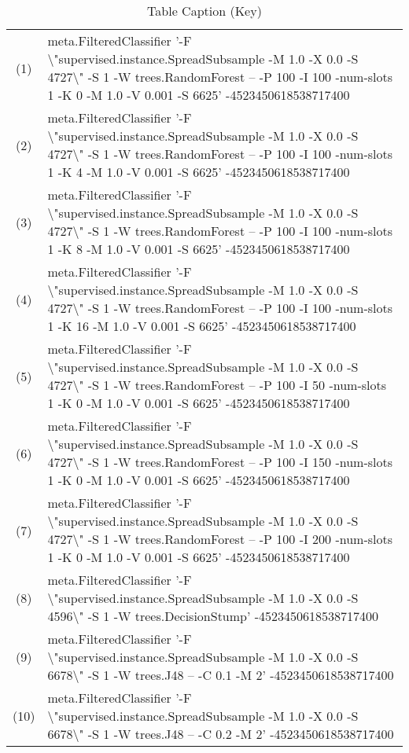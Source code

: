 \begin{table}[thb]
\caption{\label{labelname}Table Caption (Key)}
\scriptsize
{\centering
\begin{tabular}{cl}\\
(1) & meta.FilteredClassifier '-F \textbackslash"supervised.instance.SpreadSubsample -M 1.0 -X 0.0 -S 4727\textbackslash" -S 1 -W trees.RandomForest -- -P 100 -I 100 -num-slots 1 -K 0 -M 1.0 -V 0.001 -S 6625' -4523450618538717400 \\
(2) & meta.FilteredClassifier '-F \textbackslash"supervised.instance.SpreadSubsample -M 1.0 -X 0.0 -S 4727\textbackslash" -S 1 -W trees.RandomForest -- -P 100 -I 100 -num-slots 1 -K 4 -M 1.0 -V 0.001 -S 6625' -4523450618538717400 \\
(3) & meta.FilteredClassifier '-F \textbackslash"supervised.instance.SpreadSubsample -M 1.0 -X 0.0 -S 4727\textbackslash" -S 1 -W trees.RandomForest -- -P 100 -I 100 -num-slots 1 -K 8 -M 1.0 -V 0.001 -S 6625' -4523450618538717400 \\
(4) & meta.FilteredClassifier '-F \textbackslash"supervised.instance.SpreadSubsample -M 1.0 -X 0.0 -S 4727\textbackslash" -S 1 -W trees.RandomForest -- -P 100 -I 100 -num-slots 1 -K 16 -M 1.0 -V 0.001 -S 6625' -4523450618538717400 \\
(5) & meta.FilteredClassifier '-F \textbackslash"supervised.instance.SpreadSubsample -M 1.0 -X 0.0 -S 4727\textbackslash" -S 1 -W trees.RandomForest -- -P 100 -I 50 -num-slots 1 -K 0 -M 1.0 -V 0.001 -S 6625' -4523450618538717400 \\
(6) & meta.FilteredClassifier '-F \textbackslash"supervised.instance.SpreadSubsample -M 1.0 -X 0.0 -S 4727\textbackslash" -S 1 -W trees.RandomForest -- -P 100 -I 150 -num-slots 1 -K 0 -M 1.0 -V 0.001 -S 6625' -4523450618538717400 \\
(7) & meta.FilteredClassifier '-F \textbackslash"supervised.instance.SpreadSubsample -M 1.0 -X 0.0 -S 4727\textbackslash" -S 1 -W trees.RandomForest -- -P 100 -I 200 -num-slots 1 -K 0 -M 1.0 -V 0.001 -S 6625' -4523450618538717400 \\
(8) & meta.FilteredClassifier '-F \textbackslash"supervised.instance.SpreadSubsample -M 1.0 -X 0.0 -S 4596\textbackslash" -S 1 -W trees.DecisionStump' -4523450618538717400 \\
(9) & meta.FilteredClassifier '-F \textbackslash"supervised.instance.SpreadSubsample -M 1.0 -X 0.0 -S 6678\textbackslash" -S 1 -W trees.J48 -- -C 0.1 -M 2' -4523450618538717400 \\
(10) & meta.FilteredClassifier '-F \textbackslash"supervised.instance.SpreadSubsample -M 1.0 -X 0.0 -S 6678\textbackslash" -S 1 -W trees.J48 -- -C 0.2 -M 2' -4523450618538717400 \\

\end{tabular}}
\end{table}

